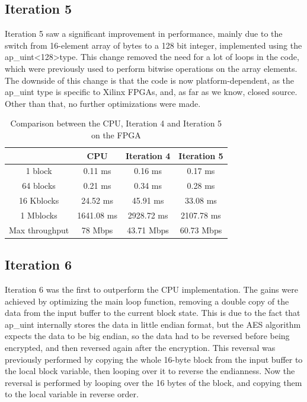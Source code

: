 \documentclass[12pt,oneside,a4paper]{article}
\begin{document}
\subsection{Iteration 5} \label{subsec:iter5}
Iteration 5 saw a significant improvement in performance, mainly due to the switch from 16-element array of bytes to a 128 bit integer, implemented using the ap\_uint\textless128\textgreater type.
This change removed the need for a lot of loops in the code, which were previously used to perform bitwise operations on the array elements.
The downside of this change is that the code is now platform-dependent, as the ap\_uint type is specific to Xilinx FPGAs, and, as far as we know, closed source. Other than that, no further optimizations were made.

\begin{table}[H]
	\centering
	\begin{tabular}{cccc}
		\toprule
		 & CPU & Iteration 4 & Iteration 5 \\
		\midrule
		1 block & 0.11 ms & 0.16 ms & 0.17 ms \\
		64 blocks & 0.21 ms & 0.34 ms & 0.28 ms \\
		16 Kblocks & 24.52 ms & 45.91 ms & 33.08 ms \\
		1 Mblocks & 1641.08 ms & 2928.72 ms & 2107.78 ms \\
		Max throughput & 78 Mbps & 43.71 Mbps & 60.73 Mbps \\
		\bottomrule
	\end{tabular}
	\caption{Comparison between the CPU, Iteration 4 and Iteration 5 on the FPGA}
\end{table}

\subsection{Iteration 6} \label{subsec:iter6}
Iteration 6 was the first to outperform the CPU implementation. The gains were achieved by optimizing the main loop function, removing a double copy of the data from the input buffer to the current block state.
This is due to the fact that ap\_uint internally stores the data in little endian format, but the AES algorithm expects the data to be big endian, so the data had to be reversed before being encrypted, and then reversed again after the encryption.
This reversal was previously performed by copying the whole 16-byte block from the input buffer to the local block variable, then looping over it to reverse the endianness.
Now the reversal is performed by looping over the 16 bytes of the block, and copying them to the local variable in reverse order.
\end{document}
